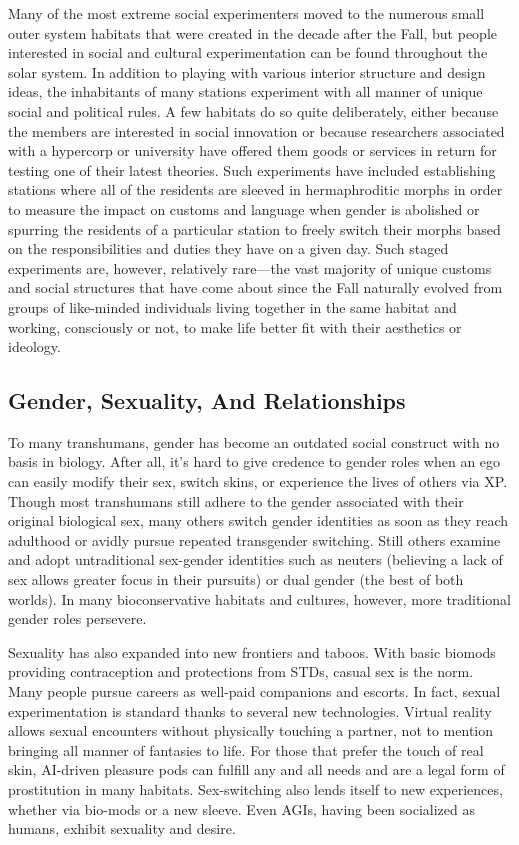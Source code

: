 Many of the most extreme social experimenters 
moved to the numerous small outer system habitats 
that were created in the decade after the Fall, but 
people interested in social and cultural experimentation can be found throughout the solar system. In addition to playing with various interior structure and 
design ideas, the inhabitants of many stations experiment with all manner of unique social and political 
rules. A few habitats do so quite deliberately, either 
because the members are interested in social innovation or because researchers associated with a hypercorp or university have offered them goods or services 
in return for testing one of their latest theories. Such 
experiments have included establishing stations where 
all of the residents are sleeved in hermaphroditic 
morphs in order to measure the impact on customs 
and language when gender is abolished or spurring 
the residents of a particular station to freely switch 
their morphs based on the responsibilities and duties 
they have on a given day. Such staged experiments are, 
however, relatively rare—the vast majority of unique 
customs and social structures that have come about 
since the Fall naturally evolved from groups of like-minded individuals living together in the same habitat 
and working, consciously or not, to make life better 
fit with their aesthetics or ideology.

\subsection{Gender, Sexuality, And Relationships}

To many transhumans, gender has become an outdated social construct with no basis in biology. After all, 
it's hard to give credence to gender roles when an ego 
can easily modify their sex, switch skins, or experience 
the lives of others via XP. Though most transhumans 
still adhere to the gender associated with their original 
biological sex, many others switch gender identities 
as soon as they reach adulthood or avidly pursue 
repeated transgender switching. Still others examine 
and adopt untraditional sex-gender identities such as 
neuters (believing a lack of sex allows greater focus in 
their pursuits) or dual gender (the best of both worlds). 
In many bioconservative habitats and cultures, however, more traditional gender roles persevere.

Sexuality has also expanded into new frontiers and 
taboos. With basic biomods providing contraception 
and protections from STDs, casual sex is the norm. 
Many people pursue careers as well-paid companions 
and escorts. In fact, sexual experimentation is standard thanks to several new technologies. Virtual reality allows sexual encounters without physically touching a partner, not to mention bringing all manner of 
fantasies to life. For those that prefer the touch of real 
skin, AI-driven pleasure pods can fulfill any and all 
needs and are a legal form of prostitution in many 
habitats. Sex-switching also lends itself to new experiences, whether via bio-mods or a new sleeve. Even 
AGIs, having been socialized as humans, exhibit sexuality and desire.

